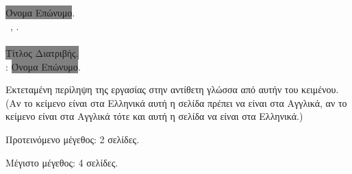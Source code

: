 \chapter*{\cseextabstract}
\label{ch:ExtendedAbstract}
\addstarredchapter{\cseextabstract} %
\makeatletter

\colorbox{gray}{Όνομα Επώνυμο}.\\
\cseextabstracttype\ \cseextabstractcs, \@date.\\
\cseextabstractdpt\\
\colorbox{gray}{Τίτλος Διατριβής.}\\
\cseextabstractsup: \colorbox{gray}{Όνομα Επώνυμο}.\\
\bigskip

\noindent Εκτεταμένη περίληψη της εργασίας στην αντίθετη
γλώσσα από αυτήν του κειμένου. (Αν το κείμενο είναι στα
Ελληνικά αυτή η σελίδα πρέπει να είναι στα Αγγλικά, αν
το κείμενο είναι στα Αγγλικά τότε και αυτή η σελίδα να
είναι στα Ελληνικά.)

\y\noindent Προτεινόμενο μέγεθος: 2 σελίδες.

\y\noindent Μέγιστο μέγεθος: 4 σελίδες.